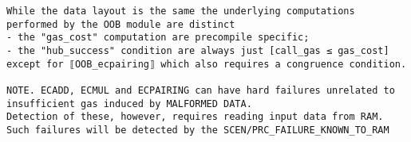 \documentclass[varwidth=\maxdimen,margin=0.5cm,multi={verbatim}]{standalone}
\begin{document}
\begin{verbatim}
While the data layout is the same the underlying computations performed by the OOB module are distinct
- the "gas_cost" computation are precompile specific;
- the "hub_success" condition are always just [call_gas ≤ gas_cost] except for ⟦OOB_ecpairing⟧ which also requires a congruence condition.

NOTE. ECADD, ECMUL and ECPAIRING can have hard failures unrelated to insufficient gas induced by MALFORMED DATA.
Detection of these, however, requires reading input data from RAM. Such failures will be detected by the SCEN/PRC_FAILURE_KNOWN_TO_RAM 
\end{verbatim}
\end{document}
